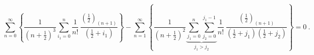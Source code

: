 \begin{equation}
\sum_{n=0}^\infty
\left\{
\frac{1}{(n+\frac{1}{2})^3}
\sum_{i_1=0}^n
\frac{1}{n!}\ \frac{(\frac{1}{2})_{(n+1)}}{(\frac{1}{2}+i_1)}
\right\}
-\sum_{n=1}^\infty
\left\{
\frac{1}{(n+\frac{1}{2})^2}
\underbrace{
\sum_{j_1=0}^n
\sum_{j_2=0}^{j_1-1}
}_{j_1>j_2}
\frac{1}{n!}\
\frac{(\frac{1}{2})_{(n+1)}}{(\frac{1}{2}+j_1)(\frac{1}{2}+j_2)}
\right\} = 0\ .
\label{12}
\end{equation}

